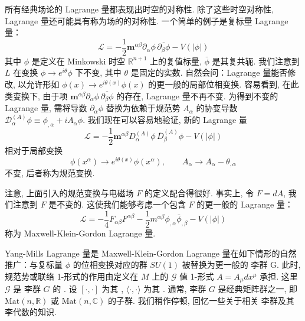 
所有经典场论的 Lagrange 量都表现出时空的对称性. 除了这些时空对称性, Lagrange 量还可能具有称为场的的对称性. 一个简单的例子是复标量 Lagrange 量：
\[
\mathcal{L} = -\frac{1}{2}\mathbf{m}^{\alpha\beta}\partial_\alpha\phi\, \overline{\partial_\beta\phi} - V(|\phi|)
\]
其中 $\phi$ 是定义在 Minkowski 时空 $\mathbb{R}^{n+1}$ 上的复值标量, $\bar{\phi}$ 是其复共轭. 我们注意到 $L$ 在变换 $\phi \to e^{i\theta}\phi$ 下不变, 其中 $\theta$ 是固定的实数. 自然会问：Lagrange 量能否修改, 以允许形如 $\phi(x) \to e^{i\theta(x)}\phi(x)$ 的更一般的局部位相变换. 容易看到, 在此类变换下, 由于项 $\mathbf{m}^{\alpha\beta}\partial_\alpha\phi\, \overline{\partial_\beta\phi}$ 的存在, Lagrange 量不再不变. 为得到不变的 Lagrange 量, 需将导数 $\partial_\alpha\phi$ 替换为依赖于规范势 $A_\alpha$ 的协变导数 $\mathcal{D}_\alpha^{(A)}\phi \equiv \phi_{, \alpha} + iA_\alpha\phi$. 我们现在可以容易地验证, 新的 Lagrange 量
\[
\mathcal{L} = -\frac{1}{2}\mathbf{m}^{\alpha\beta}D_\alpha^{(A)}\phi\, \bar{D}_\beta^{(A)}\phi - V(|\phi|)
\]
相对于局部变换
\[
\phi(x^\alpha) \to e^{i\theta(x)}\phi(x^\alpha), \qquad A_\alpha \to A_\alpha - \theta_{, \alpha}
\]
不变, 后者称为规范变换. 

注意, 上面引入的规范变换与电磁场 $F$ 的定义配合得很好. 事实上, 令 $F = dA$, 我们注意到 $F$ 是不变的. 这使我们能够考虑一个包含 $F$ 的更一般的 Lagrange 量：
\[
\mathcal{L} = -\frac{1}{4}F_{\alpha\beta}F^{\alpha\beta} - \frac{1}{2}m^{\alpha\beta}\phi_{, \alpha}\bar{\phi}_{, \beta} - V(|\phi|)
\]
称为 Maxwell-Klein-Gordon Lagrange 量. 

Yang-Mills Lagrange 量是 Maxwell-Klein-Gordon Lagrange 量在如下情形的自然推广：与复标量 $\phi$ 的位相变换对应的群 $SU(1)$ 被替换为更一般的 李群 G. 此时, 规范势或联络 1-形式的作用由定义在 $M$ 上的 $\mathcal{G}$ 值 1-形式 $A = A_\mu dx^\mu$ 承担. 这里 $\mathcal{G}$ 是 李群 $G$ 的 . 设 $[\cdot, \cdot]$ 为其 , $\langle\cdot, \cdot\rangle$ 为其 . 通常, 李群 $G$ 是经典矩阵群之一, 即 $\mathrm{Mat}(n, \mathbb{R})$ 或 $\mathrm{Mat}(n, \mathbb{C})$ 的子群. 我们稍作停顿, 回忆一些关于相关 李群及其 李代数的知识. 

